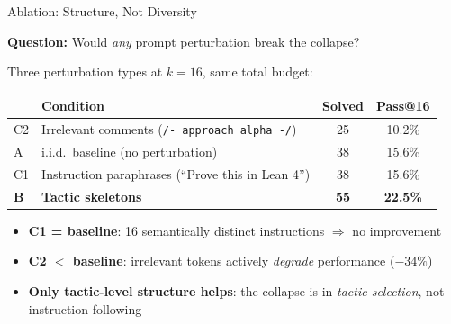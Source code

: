 \documentclass[aspectratio=169]{beamer}
\begin{document}
\begin{frame}{Ablation: Structure, Not Diversity}

\textbf{Question:} Would \emph{any} prompt perturbation break the collapse?

\vspace{0.3em}
Three perturbation types at $k{=}16$, same total budget:

\vspace{0.3em}
\begin{table}
\centering
\begin{tabular}{llcc}
\toprule
& \textbf{Condition} & \textbf{Solved} & \textbf{Pass@16} \\
\midrule
C2 & Irrelevant comments (\texttt{/- approach alpha -/}) & 25 & 10.2\% \\
A  & i.i.d.\ baseline (no perturbation) & 38 & 15.6\% \\
C1 & Instruction paraphrases (``Prove this in Lean 4'') & 38 & 15.6\% \\
\textbf{B} & \textbf{Tactic skeletons} & \textbf{55} & \textbf{22.5\%} \\
\bottomrule
\end{tabular}
\end{table}

\vspace{0.3em}
\begin{itemize}
    \item \textbf{C1 = baseline}: 16 semantically distinct instructions $\Rightarrow$ no improvement
    \item \textbf{C2 $<$ baseline}: irrelevant tokens actively \emph{degrade} performance ($-34\%$)
    \item \textbf{Only tactic-level structure helps}: the collapse is in \emph{tactic selection}, not instruction following
\end{itemize}
\end{frame}
\end{document}
